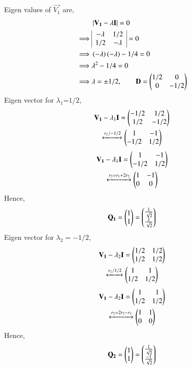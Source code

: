 \documentclass[journal,12pt,twocolumn]{IEEEtran}
\begin{document}
Eigen values of $\vec{V_1}$ are,
\begin{align}
	& \left\vert\mathbf{V_1}-\lambda\mathbf{I}\right\vert = 0 \\
	\implies	& \begin{array}{|cc|}
		-\lambda & 1/2 \\ 1/2 & -\lambda
	\end{array}=0 \\
	\implies & \left(-\lambda\right)\left(-\lambda\right) -1/4 =0\\
	\implies &\lambda^2 -1/4 =0 \\
	\implies & \lambda = \pm 1/2, \qquad \mathbf{D} = \begin{pmatrix}1/2 & 0 \\ 0 & - 1/2\end{pmatrix} 
\end{align}
Eigen vector for $\lambda_1$=$1/2$,
\begin{multline}
	\mathbf{V_1}-\lambda_1\mathbf{I} = \begin{pmatrix}-1/2 & 1/2  \\ 1/2 & -1/2\end{pmatrix}\\
	\xleftrightarrow[]{r_1/-1/2} \begin{pmatrix}1 & -1 \\ -1/2 & 1/2\end{pmatrix}
\end{multline}
\begin{multline}
	\mathbf{V_1}-\lambda_1\mathbf{I} = \begin{pmatrix}1 & -1 \\ -1/2 & 1/2\end{pmatrix} \\
	\xleftrightarrow[]{r_2 = r_1 + 2r_2} \begin{pmatrix}1 & -1 \\ 0 & 0\end{pmatrix}
\end{multline}
Hence,
\begin{align}
	\mathbf{Q_1}= \begin{pmatrix}1 \\ 1\end{pmatrix} = \begin{pmatrix}\frac{1}{\sqrt{2}} \\ \frac{1}{\sqrt{2}}\end{pmatrix}
\end{align}
Eigen vector for $\lambda_2 = -1/2$,
\begin{multline}
	\mathbf{V_1}-\lambda_2\mathbf{I} = \begin{pmatrix}1/2 & 1/2 \\ 1/2 & 1/2\end{pmatrix}\\
	\xleftrightarrow[]{r_1/1/2} \begin{pmatrix}1 & 1 \\ 1/2 & 1/2\end{pmatrix}
\end{multline}
\begin{multline}
	\mathbf{V_1}-\lambda_2\mathbf{I} = \begin{pmatrix}1 & 1 \\ 1/2 & 1/2\end{pmatrix} \\
	\xleftrightarrow[]{r_2 = 2r_2-r_1} \begin{pmatrix}1 & 1 \\ 0 & 0\end{pmatrix}
\end{multline}
Hence,
\begin{align}
	\mathbf{Q_2}= \begin{pmatrix}1\\1\end{pmatrix} = \begin{pmatrix} \frac{1}{\sqrt{2}} \\ \frac{-1}{\sqrt{2}}\end{pmatrix}
\end{align}
\end{document}
